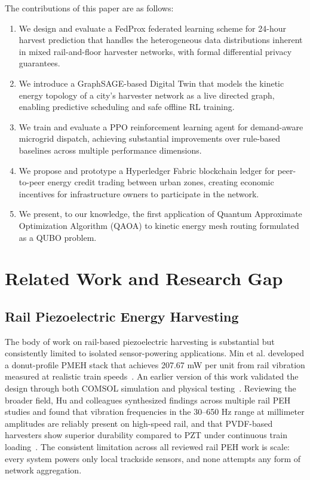 \documentclass[conference]{IEEEtran}
\begin{document}
The contributions of this paper are as follows:
\begin{enumerate}
    \item We design and evaluate a FedProx federated learning scheme for 24-hour harvest prediction that handles the heterogeneous data distributions inherent in mixed rail-and-floor harvester networks, with formal differential privacy guarantees.
    \item We introduce a GraphSAGE-based Digital Twin that models the kinetic energy topology of a city's harvester network as a live directed graph, enabling predictive scheduling and safe offline RL training.
    \item We train and evaluate a PPO reinforcement learning agent for demand-aware microgrid dispatch, achieving substantial improvements over rule-based baselines across multiple performance dimensions.
    \item We propose and prototype a Hyperledger Fabric blockchain ledger for peer-to-peer energy credit trading between urban zones, creating economic incentives for infrastructure owners to participate in the network.
    \item We present, to our knowledge, the first application of Quantum Approximate Optimization Algorithm (QAOA) to kinetic energy mesh routing formulated as a QUBO problem.
\end{enumerate}

\section{Related Work and Research Gap}

\subsection{Rail Piezoelectric Energy Harvesting}

The body of work on rail-based piezoelectric harvesting is substantial but consistently limited to isolated sensor-powering applications. Min et al. developed a donut-profile PMEH stack that achieves 207.67 mW per unit from rail vibration measured at realistic train speeds~\cite{min2024}. An earlier version of this work validated the design through both COMSOL simulation and physical testing~\cite{min2023}. Reviewing the broader field, Hu and colleagues synthesized findings across multiple rail PEH studies and found that vibration frequencies in the 30--650 Hz range at millimeter amplitudes are reliably present on high-speed rail, and that PVDF-based harvesters show superior durability compared to PZT under continuous train loading~\cite{springer2025}. The consistent limitation across all reviewed rail PEH work is scale: every system powers only local trackside sensors, and none attempts any form of network aggregation.
\end{document}
